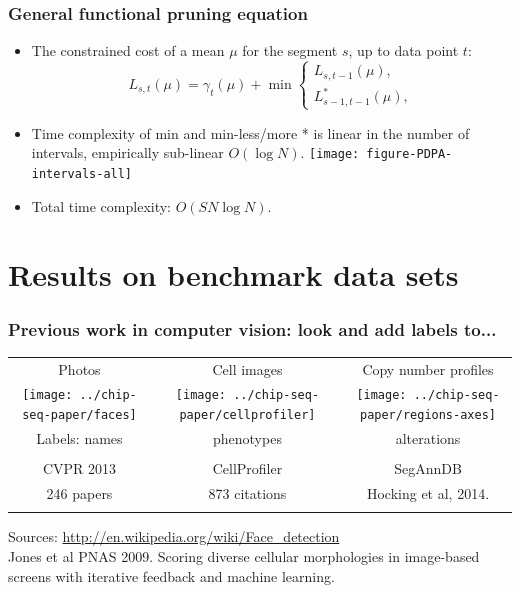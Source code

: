 \documentclass{beamer}
\begin{document}
\begin{frame}
  \frametitle{General functional pruning equation}
  \begin{itemize}
  \item The constrained cost of a mean $\mu$ for the segment $s$,
    up to data point $t$:
    \begin{equation*}
      L_{s,t}(\mu) = \gamma_t(\mu) + \min
      \begin{cases}
        L_{s,t-1}(\mu),\\
        L_{s-1,t-1}^{*}(\mu),
      \end{cases}
    \end{equation*}
  \item Time complexity of min and min-less/more * is linear in the
    number of intervals, empirically sub-linear $O(\log N)$.
    \texttt{[image: figure-PDPA-intervals-all]}
  \item Total time complexity: $O(S N\log N)$.
  \end{itemize}
\end{frame}

\section{Results on benchmark data sets}

\begin{frame}
  \frametitle{Previous work in computer vision: look and add labels
    to...}
  \begin{tabular}{ccc}
    Photos & Cell images & Copy number profiles \\
    \texttt{[image: ../chip-seq-paper/faces]} &
    \texttt{[image: ../chip-seq-paper/cellprofiler]} &
    \texttt{[image: ../chip-seq-paper/regions-axes]}\\
    Labels: names & phenotypes & alterations \\ \\
    CVPR 2013 & CellProfiler & SegAnnDB \\
    246 papers & 873 citations & Hocking et al, 2014. \\
     &
  \end{tabular}
  Sources: \url{http://en.wikipedia.org/wiki/Face_detection}\\
  Jones et al PNAS 2009. Scoring diverse cellular morphologies in
  image-based screens with iterative feedback and machine learning.
\end{frame}
\end{document}
